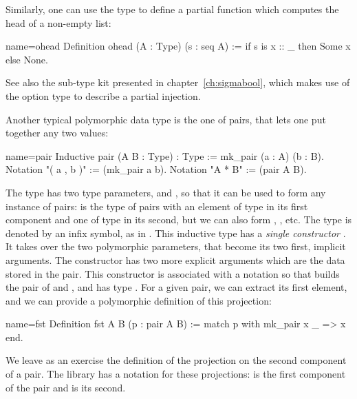 Similarly, one can use the  type to define a partial function
which computes the head of a non-empty list:


\begin{coq}{name=ohead}{}
Definition ohead (A : Type) (s : seq A) :=
  if s is x :: _ then Some x else None.
\end{coq}


See also the sub-type kit presented in chapter~\ref{ch:sigmabool},
which makes use of the option type to describe a partial injection.

Another typical polymorphic data type is the one of pairs, that
lets one put together any two values:
\index[coq]{\C{(_ , _)}}

\begin{coq}{name=pair}{}
Inductive pair (A B : Type) : Type := mk_pair (a : A) (b : B).
Notation "( a , b )" := (mk_pair a b).
Notation "A * B" := (pair A B).
\end{coq}

The type  has two type parameters,  and
, so
that it can be used to form any instance of pairs: 
is the type of pairs with an element of type  in its first
component and one of type  in its second, but we can also form
, , etc. The type  is
denoted by an infix \C{*} symbol, as in .
This inductive type has
a \emph{single constructor} . It takes over the two
polymorphic parameters, that become its two first, implicit arguments.
The constructor  has two more explicit arguments which are
the data stored in the pair. This constructor is associated with
a notation so that  builds the pair of  and , and
 has type . For a given pair, we can
extract its first element, and we can provide a polymorphic definition
of this projection:

\begin{coq}{name=fst}{}
Definition fst A B (p : pair A B) :=
  match p with mk_pair x _ => x end.
\end{coq}

We leave as an exercise the definition of the projection on the second
component of a pair. The \mcbMC{} library has a notation for these
projections:  is the first component of the pair 
and  is its second.

